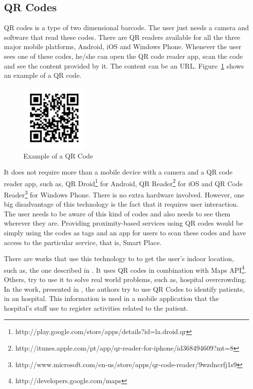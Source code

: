 \subsection{QR Codes}
\label{sub:background_qr_codes}
\gls{QR} codes is a type of two dimensional barcode.
The user just needs a camera and software that read these codes.
There are \gls{QR} readers available for all the three major mobile platforms, Android, iOS and Windows Phone.
Whenever the user sees one of these codes, he/she can open the \gls{QR} code reader app, scan the code and see the content provided by it.
The content can be an \gls{URL}.
Figure~\ref{fig:qr_code} shows an example of a \gls{QR} code.

\begin{figure}[!ht]
  \centering
    \includegraphics[width=0.3\textwidth, keepaspectratio]{images/qr_code}
    \caption{Example of a QR Code}
    \label{fig:qr_code}
\end{figure}

It does not require more than a mobile device with a camera and a \gls{QR} code reader app, such as, QR Droid\footnote{http://play.google.com/store/apps/details?id=la.droid.qr} for Android, QR Reader\footnote{http://itunes.apple.com/pt/app/qr-reader-for-iphone/id368494609?mt=8} for iOS and QR Code Reader\footnote{http://www.microsoft.com/en-us/store/apps/qr-code-reader/9wzdncrfj1s9} for Windows Phone.
There is no extra hardware involved.
However, one big disadvantage of this technology is the fact that it requires user interaction.
The user needs to be aware of this kind of codes and also needs to see them wherever they are.
Providing proximity-based services using \gls{QR} codes would be simply using the codes as tags and an app for users to scan these codes and have access to the particular service, that is, Smart Place.

There are works that use this technology to to get the user's indoor location, such as, the one described in \cite{qr_indoor}.
It uses \gls{QR} codes in combination with  Maps \gls{API}\footnote{http://developers.google.com/maps}.
Others, try to use it to solve real world problems, such as, hospital overcrowding.
In the work, presented in \cite{qr_hospital}, the authors try to use \gls{QR} Codes to identify patients, in an hospital.
This information is used in a mobile application that the hospital's staff use to register activities related to the patient.


